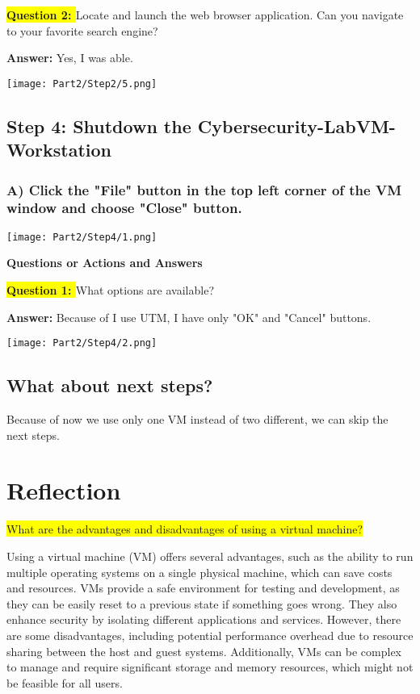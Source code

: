 \documentclass{article}
\begin{document}
\newpage
\textbf{\colorbox{yellow}{Question 2: }}Locate and launch the web browser application. Can you navigate to your favorite search engine?

\textbf{Answer: } Yes, I was able. 

\texttt{[image: Part2/Step2/5.png]}

\subsection*{Step 4: Shutdown the Cybersecurity-LabVM-Workstation} 

\subsubsection*{A) Click the "File" button in the top left corner of the VM window and choose "Close" button.}

\texttt{[image: Part2/Step4/1.png]}

\newpage

\textbf{Questions or Actions and Answers} 

\vspace{1\baselineskip}

\textbf{\colorbox{yellow}{Question 1: }} What options are available? 

\vspace{1\baselineskip}

\textbf{Answer: } Because of I use UTM, I have only "OK" and "Cancel" buttons.

\vspace{1\baselineskip}

\texttt{[image: Part2/Step4/2.png]}

\subsection*{What about next steps?}
Because of now we use only one VM instead of two different, we can skip the next steps.

\section*{Reflection}
\colorbox{yellow}{What are the advantages and disadvantages of using a virtual machine?}

\vspace{1\baselineskip}

Using a virtual machine (VM) offers several advantages, such as the ability to run multiple operating systems on a single physical machine, which can save costs and resources. VMs provide a safe environment for testing and development, as they can be easily reset to a previous state if something goes wrong. They also enhance security by isolating different applications and services. However, there are some disadvantages, including potential performance overhead due to resource sharing between the host and guest systems. Additionally, VMs can be complex to manage and require significant storage and memory resources, which might not be feasible for all users.
\end{document}
